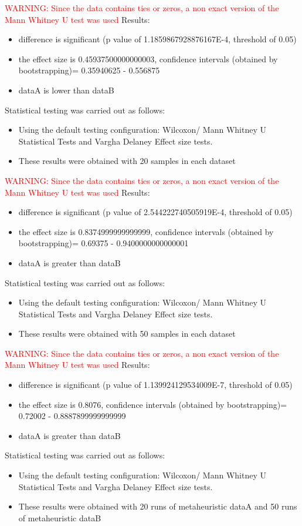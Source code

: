 \documentclass[]{article}
\begin{document}
\textcolor{Red}{WARNING: Since the data contains ties or zeros, a non exact version of the Mann Whitney U test was used
}
Results:
\begin{itemize}
\item{difference is significant (p value of 1.1859867928876167E-4, threshold of 0.05)}
\item{the effect size is 0.45937500000000003, confidence intervals (obtained by bootstrapping)= 0.35940625 - 0.556875}
\item{dataA is lower than dataB}
\end{itemize}Statistical testing was carried out as follows: \begin{itemize}
\item{Using the default testing configuration: Wilcoxon/ Mann Whitney U Statistical Tests and Vargha Delaney Effect size tests.}
\item{These results were obtained with 20 samples in each dataset}
\end{itemize}
\textcolor{Red}{WARNING: Since the data contains ties or zeros, a non exact version of the Mann Whitney U test was used
}
Results:
\begin{itemize}
\item{difference is significant (p value of 2.544222740505919E-4, threshold of 0.05)}
\item{the effect size is 0.8374999999999999, confidence intervals (obtained by bootstrapping)= 0.69375 - 0.9400000000000001}
\item{dataA is greater than dataB}
\end{itemize}Statistical testing was carried out as follows: \begin{itemize}
\item{Using the default testing configuration: Wilcoxon/ Mann Whitney U Statistical Tests and Vargha Delaney Effect size tests.}
\item{These results were obtained with 50 samples in each dataset}
\end{itemize}
\textcolor{Red}{WARNING: Since the data contains ties or zeros, a non exact version of the Mann Whitney U test was used
}
Results:
\begin{itemize}
\item{difference is significant (p value of 1.139924129534009E-7, threshold of 0.05)}
\item{the effect size is 0.8076, confidence intervals (obtained by bootstrapping)= 0.72002 - 0.8887899999999999}
\item{dataA is greater than dataB}
\end{itemize}Statistical testing was carried out as follows: \begin{itemize}
\item{Using the default testing configuration: Wilcoxon/ Mann Whitney U Statistical Tests and Vargha Delaney Effect size tests.}
\item{These results were obtained with 20 runs of metaheuristic dataA and 50 runs of metaheuristic dataB}
\end{itemize}
\end{document}
